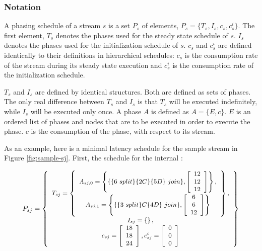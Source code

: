 \subsubsection{Notation}

A phasing schedule of a stream $s$ is a set $P_s$ of elements,
$P_s = \{T_s, I_s, c_s, c^i_s\}$.  The first element, $T_s$
denotes the phases used for the steady state schedule of $s$.
$I_s$ denotes the phases used for the initialization schedule of
$s$. $c_s$ and $c^i_s$ are defined identically to their
definitions in hierarchical schedules: $c_s$ is the consumption
rate of the stream during its steady state execution and $c^i_s$
is the consumption rate of the initialization schedule.

$T_s$ and $I_s$ are defined by identical structures.  Both are
defined as sets of phases. The only real difference between $T_s$
and $I_s$ is that $T_s$ will be executed indefinitely, while $I_s$
will be executed only once. A phase $A$ is defined as $A = \{E,
c\}$.  $E$ is an ordered list of phases and nodes that are to be
executed in order to execute the phase.  $c$ is the consumption of
the phase, with respect to its stream.

As an example, here is a minimal latency schedule for the sample
stream in Figure \ref{fig:sample-sj}.  First, the schedule for the
internal {\splitjoin}:

\begin{displaymath} \small
P_{sj} = \left\{
\begin{array}{c}
T_{sj} = \left\{
\begin{array}{c}
A_{sj,0} = \left\{\{\{6\ split\}\{2C\}\{5D\}\ join\},
\left[\begin{array}{c}12\\12\\12\end{array}\right]\right\}, \\
A_{sj,1} = \left\{\{\{3\ split\}C\{4D\}\ join\},
\left[\begin{array}{c}6\\6\\12\end{array}\right]\right\}
\end{array}\right\}, \\
I_{sj} = \left\{ \right\}, \\
c_{sj} = \left[ \begin{array}{c} 18 \\ 18 \\ 24 \end{array}
\right], c^i_{sj} = \left[ \begin{array}{c} 0 \\ 0 \\ 0
\end{array} \right]
\end{array} \right\}
\end{displaymath}

